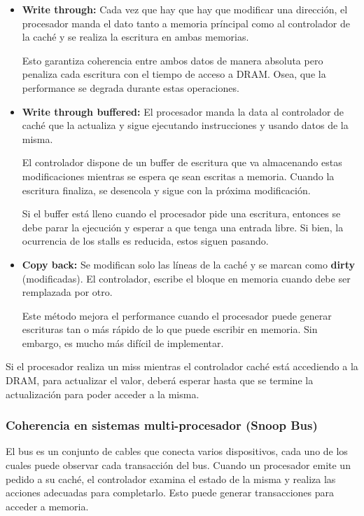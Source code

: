 \begin{itemize}
	\item \textbf{Write through:} Cada vez que hay que hay que modificar una dirección, el procesador manda el dato tanto a memoria príncipal como al controlador de la caché y se realiza la escritura en ambas memorias. 
	
	Esto garantiza coherencia entre ambos datos de manera absoluta pero penaliza cada escritura con el tiempo de acceso a DRAM. Osea, que la performance se degrada durante estas operaciones.
	
	\item \textbf{Write through buffered:} El procesador manda la data al controlador de caché que la actualiza y sigue ejecutando instrucciones y usando datos de la misma.
	
	El controlador dispone de un buffer de escritura que va almacenando estas modificaciones mientras se espera qe sean escritas a memoria. Cuando la escritura finaliza, se desencola y sigue con la próxima modificación.
	
 	Si el buffer está lleno cuando el procesador pide una escritura, entonces se debe parar la ejecución y esperar a que tenga una entrada libre. Si bien, la ocurrencia de los stalls es reducida, estos siguen pasando.
 	
 	\item \textbf{Copy back:} Se modifican solo las líneas de la caché y se marcan como \textbf{dirty} (modificadas). El controlador, escribe el bloque en memoria cuando debe ser remplazada por otro. 
 	
 	Este método mejora el performance cuando el procesador puede generar escrituras tan o más rápido de lo que puede escribir en memoria. Sin embargo, es mucho más difícil de implementar.
\end{itemize}

Si el procesador realiza un miss mientras el controlador caché está accediendo a la DRAM, para actualizar el valor, deberá esperar hasta que se termine la actualización para poder acceder a la misma.

\subsubsection{Coherencia en sistemas multi-procesador (Snoop Bus)}
El bus es un conjunto de cables que conecta varios dispositivos, cada uno de los cuales puede observar cada transacción del bus. Cuando un procesador emite un pedido a su caché, el controlador examina el estado de la misma y realiza las acciones adecuadas para completarlo. Esto puede generar transacciones para acceder a memoria.

